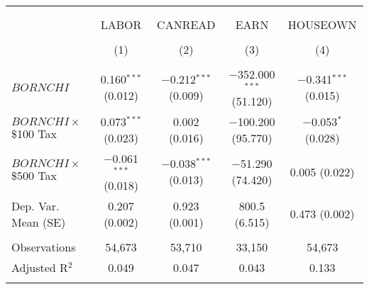 
\begin{tabular}{@{\extracolsep{5pt}}lcccc} 
\\[-1.8ex]\hline 
\hline \\[-1.8ex] 
\\[-1.8ex] & LABOR & CANREAD & EARN & HOUSEOWN \\ 
\\[-1.8ex] & (1) & (2) & (3) & (4)\\ 
\hline \\[-1.8ex] 
 $BORNCHI$ & 0.160$^{***}$ (0.012) & $-$0.212$^{***}$ (0.009) & $-$352.000$^{***}$ (51.120) & $-$0.341$^{***}$ (0.015) \\ 
  $BORNCHI \times$ \$100 Tax & 0.073$^{***}$ (0.023) & 0.002 (0.016) & $-$100.200 (95.770) & $-$0.053$^{*}$ (0.028) \\ 
  $BORNCHI \times$ \$500 Tax & $-$0.061$^{***}$ (0.018) & $-$0.038$^{***}$ (0.013) & $-$51.290 (74.420) & 0.005 (0.022) \\ 
 Dep. Var. Mean (SE) & 0.207 (0.002) & 0.923 (0.001) & 800.5 (6.515) & 0.473 (0.002) \\ 
\hline \\[-1.8ex] 
Observations & 54,673 & 53,710 & 33,150 & 54,673 \\ 
Adjusted R$^{2}$ & 0.049 & 0.047 & 0.043 & 0.133 \\ 
\hline \\[-1.8ex] 
\end{tabular} 
